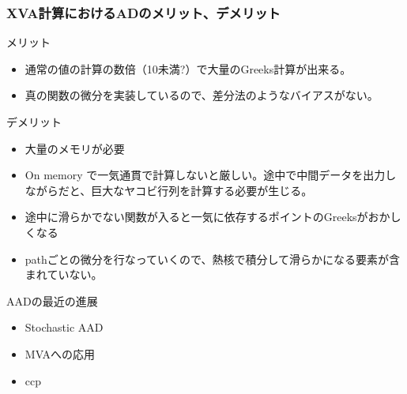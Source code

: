 \documentclass[driverfallback=dvipdfmx,cjk]{beamer}
\begin{document}
\begin{frame}\frametitle{XVA計算におけるADのメリット、デメリット}
    メリット
    \begin{itemize}
        \item 通常の値の計算の数倍（10未満?）で大量のGreeks計算が出来る。
        \item 真の関数の微分を実装しているので、差分法のようなバイアスがない。
    \end{itemize}
    デメリット
    \begin{itemize}
        \item 大量のメモリが必要
        \item On memory で一気通貫で計算しないと厳しい。途中で中間データを出力しながらだと、巨大なヤコビ行列を計算する必要が生じる。　
        \item 途中に滑らかでない関数が入ると一気に依存するポイントのGreeksがおかしくなる
        \item pathごとの微分を行なっていくので、熱核で積分して滑らかになる要素が含まれていない。
    \end{itemize}
\end{frame}

\begin{frame}
    AADの最近の進展
    \begin{itemize}
        \item Stochastic AAD
        \item MVAへの応用
        \item ccp
    \end{itemize}

\end{frame}
\end{document}
